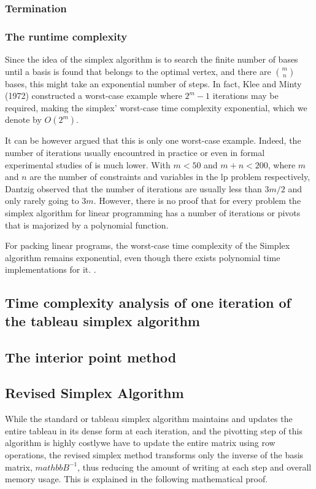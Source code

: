 \subsubsection{Termination}

\subsubsection{The runtime complexity}
Since the idea of the simplex algorithm is to search the finite number of bases until a basis is
found that belongs to the optimal vertex, and there are $\binom{m}{n}$ bases, this might take
an exponential number of steps.
In fact, Klee and Minty (1972) \parencite{klee1972good} constructed a worst-case example where
$2^m -1$ iterations may be required, making the simplex'
worst-case time complexity exponential, which we denote by \( O(2^m) \).

It can be however argued that this is only one worst-case example. Indeed, the number
of iterations usually encountred in practice or even in formal experimental studies of is much lower.
With $m<50$ and $m+n<200$, where $m$ and $n$ are the number of constraints and variables in the \gls{lp}
problem respectively, Dantzig observed that the number of iterations are usually less than $3m/2$
and only rarely going to $3m$. However, there is no proof that for every
problem the simplex algorithm for
linear programming has a number of iterations or pivots that
is majorized by a polynomial function.

For packing linear programs, the worst-case time complexity of the Simplex algorithm
remains exponential, even though there exists polynomial time implementations for it.
\parencite{stille2010solution}.

\subsection{Time complexity analysis of one iteration of the tableau simplex algorithm}

\subsection{The interior point method}

\subsection{Revised Simplex Algorithm}
While the standard or tableau simplex algorithm maintains and updates the entire tableau in its
dense form at each iteration, and the pivotting step of this algorithm is
highly costlywe have to update the entire matrix
using row operations, the revised simplex
method transforms only the inverse of the basis matrix, $mathbb{B}^{-1}$, thus
reducing the amount of writing at each step and overall memory usage.
This is explained in the following mathematical proof.
